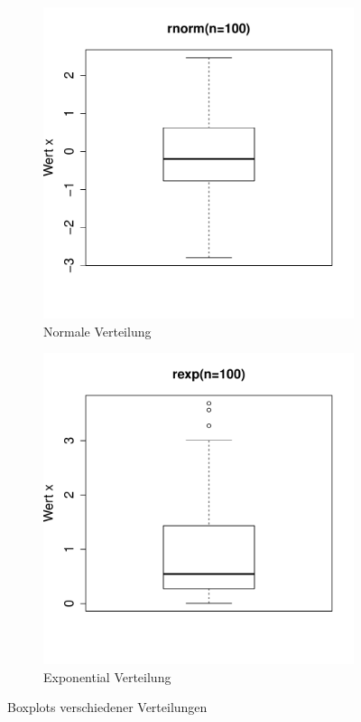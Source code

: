 \begin{figure}[h!]
\begin{subfigure}[b]{0.48\textwidth}
\includegraphics{r-cmd-033}
\caption{Normale Verteilung}
\end{subfigure}
\begin{subfigure}[b]{0.48\textwidth}
\includegraphics{r-cmd-034}
\caption{Exponential Verteilung}
\end{subfigure}
\caption{Boxplots verschiedener Verteilungen}
\end{figure}

